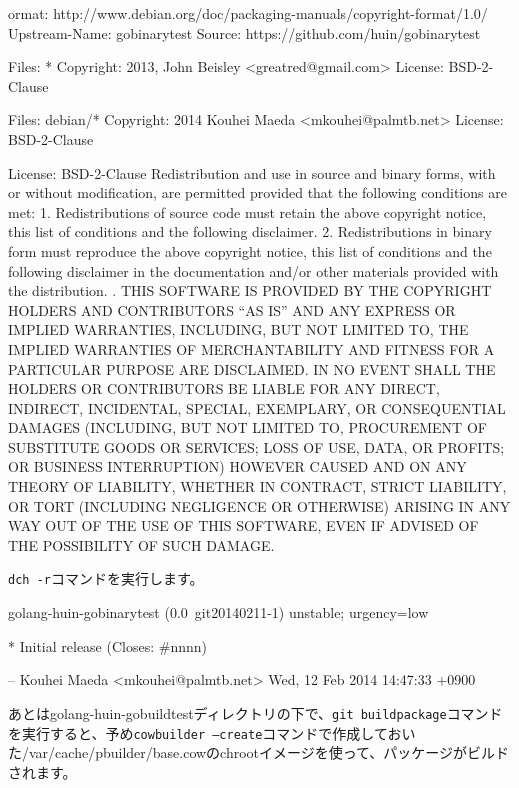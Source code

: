 \documentclass[mingoth,a4paper]{jsarticle}
\begin{document}
\begin{commandline}
ormat: http://www.debian.org/doc/packaging-manuals/copyright-format/1.0/
Upstream-Name: gobinarytest
Source: https://github.com/huin/gobinarytest

Files: *
Copyright: 2013, John Beisley <greatred@gmail.com>
License: BSD-2-Clause

Files: debian/*
Copyright: 2014 Kouhei Maeda <mkouhei@palmtb.net>
License: BSD-2-Clause

License: BSD-2-Clause
 Redistribution and use in source and binary forms, with or without
 modification, are permitted provided that the following conditions
 are met:
 1. Redistributions of source code must retain the above copyright
    notice, this list of conditions and the following disclaimer.
 2. Redistributions in binary form must reproduce the above copyright
    notice, this list of conditions and the following disclaimer in the
    documentation and/or other materials provided with the distribution.
 .
 THIS SOFTWARE IS PROVIDED BY THE COPYRIGHT HOLDERS AND CONTRIBUTORS
 ``AS IS'' AND ANY EXPRESS OR IMPLIED WARRANTIES, INCLUDING, BUT NOT 
 LIMITED TO, THE IMPLIED WARRANTIES OF MERCHANTABILITY AND FITNESS FOR
 A PARTICULAR PURPOSE ARE DISCLAIMED.  IN NO EVENT SHALL THE HOLDERS OR
 CONTRIBUTORS BE LIABLE FOR ANY DIRECT, INDIRECT, INCIDENTAL, SPECIAL, 
 EXEMPLARY, OR CONSEQUENTIAL DAMAGES (INCLUDING, BUT NOT LIMITED TO, 
 PROCUREMENT OF SUBSTITUTE GOODS OR SERVICES; LOSS OF USE, DATA, OR 
 PROFITS; OR BUSINESS INTERRUPTION) HOWEVER CAUSED AND ON ANY THEORY OF 
 LIABILITY, WHETHER IN CONTRACT, STRICT LIABILITY, OR TORT (INCLUDING 
 NEGLIGENCE OR OTHERWISE) ARISING IN ANY WAY OUT OF THE USE OF THIS 
 SOFTWARE, EVEN IF ADVISED OF THE POSSIBILITY OF SUCH DAMAGE.
\end{commandline}


\texttt{dch -r}コマンドを実行します。

\begin{commandline}
golang-huin-gobinarytest (0.0~git20140211-1) unstable; urgency=low

  * Initial release (Closes: #nnnn)

 -- Kouhei Maeda <mkouhei@palmtb.net>  Wed, 12 Feb 2014 14:47:33 +0900
\end{commandline}

あとはgolang-huin-gobuildtestディレクトリの下で、\texttt{git buildpackage}コマンドを実行すると、予め\texttt{cowbuilder --create}コマンドで作成しておいた/var/cache/pbuilder/base.cowのchrootイメージを使って、パッケージがビルドされます。
\end{document}

